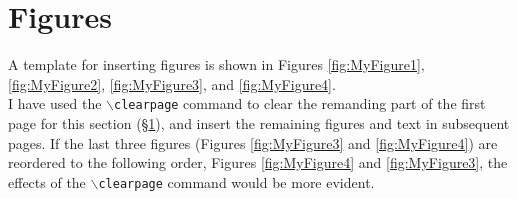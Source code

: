 









\chapter{Figures}
\label{chp:Figures}

A template for inserting figures is shown in Figures \ref{fig:MyFigure1}, \ref{fig:MyFigure2}, \ref{fig:MyFigure3}, and \ref{fig:MyFigure4}. \\

I have used the {\tt $\backslash$clearpage} command to clear the remanding part of the first page for this section (\S\ref{chp:Figures}), and insert the remaining figures and text in subsequent pages. If the last three figures (Figures  \ref{fig:MyFigure3} and \ref{fig:MyFigure4}) are reordered to the following order, Figures \ref{fig:MyFigure4} and \ref{fig:MyFigure3}, the effects of the {\tt $\backslash$clearpage} command would be more evident.


